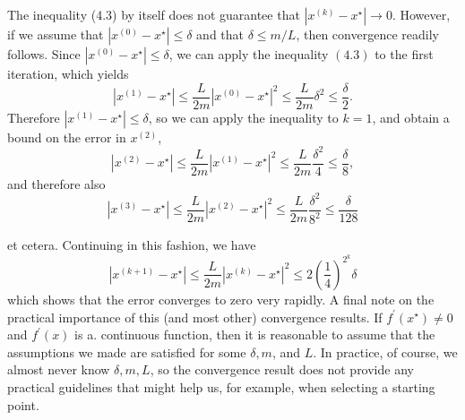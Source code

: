 The inequality (4.3) by itself does not guarantee that $ \left|x^{(k)}-x^{\star}\right| \rightarrow 0 $. However, if we assume that $ \left|x^{(0)}-x^{\star}\right| \leq \delta $ and that $ \delta \leq m / L $, then convergence readily follows. Since $ \left|x^{(0)}-x^{\star}\right| \leq \delta $, we can apply the inequality $ (4.3) $ to the first iteration, which yields
\begin{equation}
\left|x^{(1)}-x^{\star}\right| \leq \frac{L}{2 m}\left|x^{(0)}-x^{\star}\right|^{2} \leq \frac{L}{2 m} \delta^{2} \leq \frac{\delta}{2} .
\end{equation}
Therefore $ \left|x^{(1)}-x^{\star}\right| \leq \delta $, so we can apply the inequality to $ k=1 $, and obtain a bound on the error in $ x^{(2)} $,
\begin{equation}
\left|x^{(2)}-x^{\star}\right| \leq \frac{L}{2 m}\left|x^{(1)}-x^{\star}\right|^{2} \leq \frac{L}{2 m} \frac{\delta^{2}}{4} \leq \frac{\delta}{8},
\end{equation}
and therefore also
\begin{equation}
\left|x^{(3)}-x^{\star}\right| \leq \frac{L}{2 m}\left|x^{(2)}-x^{\star}\right|^{2} \leq \frac{L}{2 m} \frac{\delta^{2}}{8^{2}} \leq \frac{\delta}{128}
\end{equation}

et cetera. Continuing in this fashion, we have
\begin{equation}
\left|x^{(k+1)}-x^{\star}\right| \leq \frac{L}{2 m}\left|x^{(k)}-x^{\star}\right|^{2} \leq 2\left(\frac{1}{4}\right)^{2^{k}} \delta
\end{equation}
which shows that the error converges to zero very rapidly.
A final note on the practical importance of this (and most other) convergence results. If $ f^{\prime}\left(x^{\star}\right) \neq 0 $ and $ f^{\prime}(x) $ is a. continuous function, then it is reasonable to assume that the assumptions we made are satisfied for some $ \delta, m $, and $ L $. In practice, of course, we almost never know $ \delta, m, L $, so the convergence result does not provide any practical guidelines that might help us, for example, when selecting a starting point.

